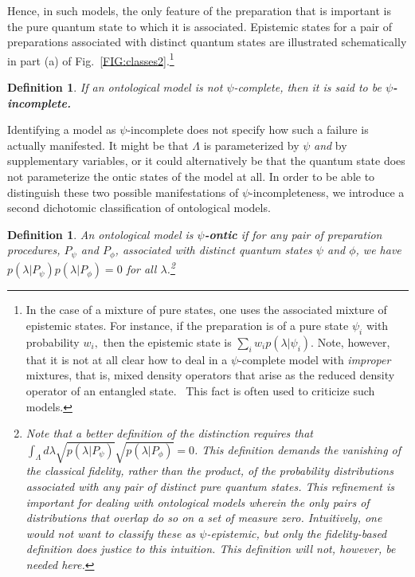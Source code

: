 \documentclass[aps,nofootinbib,12pt]{revtex4-2}
\newtheorem{definition}[theorem]{Definition}
\begin{document}
Hence, in such models, the only feature of the preparation that is
important is the pure quantum state to which it is associated.
Epistemic states for a pair of preparations associated with distinct
quantum states are illustrated schematically in part (a) of
Fig.~\ref{FIG:classes2}.\footnote{In the case of a mixture of pure
states, one uses the associated mixture of epistemic states. For
instance, if the preparation is of a pure state $\psi_{i}$ with
probability $w_{i},$ then the epistemic state is
$\sum_{i}w_{i}p(\lambda|\psi _{i})$. Note, however, that it is not
at all clear how to deal in a $\psi$-complete model with
\emph{improper} mixtures, that is, mixed density operators that
arise as the reduced density operator of an entangled state. \ This
fact is often used to criticize such models.}

\begin{definition}
\strut If an ontological model is not $\psi$-complete, then it is said to be
\textbf{$\psi$-incomplete. }\label{DEF:psi_incomplete}
\end{definition}

Identifying a model as $\psi $-incomplete does not specify how such
a failure is actually manifested. It might be that $\Lambda$ is
parameterized by $\psi$ \textit{and} by supplementary variables, or
it could alternatively be that the quantum state does not
parameterize the ontic states of the model at all. In order to be
able to distinguish these two possible manifestations of $\psi
$-incompleteness, we introduce a second dichotomic classification of
ontological models.

\begin{definition}
An ontological model is \textbf{$\psi$-ontic} if for any pair of
preparation procedures, $P_{\psi}$ and ${P}_{\phi}$, associated with
distinct quantum states $\psi$ and $\phi$, we have
$p(\lambda|P_{\psi})p(\lambda |P_{\phi})=0$ for all
$\lambda$.\footnote{Note that a better definition of the distinction
requires that $\int_\Lambda d\lambda
\sqrt{p(\lambda|P_{\psi})}\sqrt{p(\lambda |P_{\phi})}=0$. This
definition demands the vanishing of the \textit{classical fidelity},
rather than the product, of the probability distributions associated
with any pair of distinct pure quantum states. This refinement is
important for dealing with ontological models wherein the only pairs
of distributions that overlap do so on a set of measure zero.
Intuitively, one would not want to classify these as
$\psi$-epistemic, but only the fidelity-based definition does
justice to this intuition. This definition will not, however, be
needed here.\label{FNOTE:fidelity}} \label{DEF:psi_ontic}
\end{definition}
\end{document}
